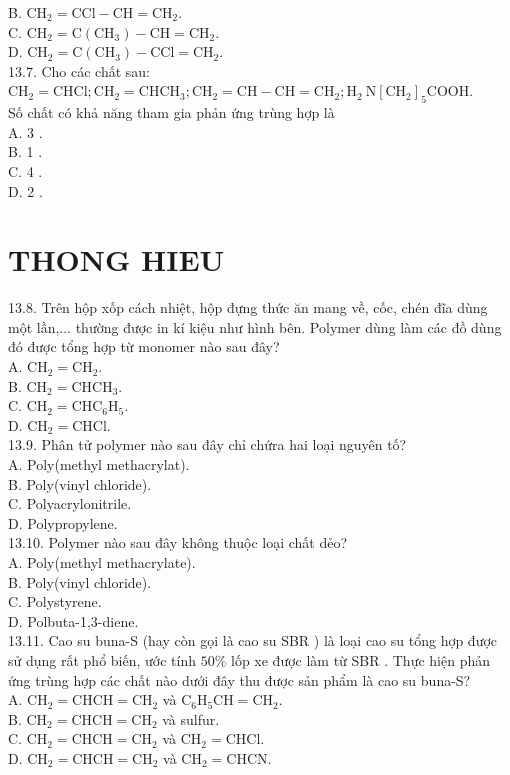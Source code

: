 \documentclass[10pt]{article}
\begin{document}
B. $\mathrm{CH}_{2}=\mathrm{CCl}-\mathrm{CH}=\mathrm{CH}_{2}$.\\
C. $\mathrm{CH}_{2}=\mathrm{C}\left(\mathrm{CH}_{3}\right)-\mathrm{CH}=\mathrm{CH}_{2}$.\\
D. $\mathrm{CH}_{2}=\mathrm{C}\left(\mathrm{CH}_{3}\right)-\mathrm{CCl}=\mathrm{CH}_{2}$.\\
13.7. Cho các chất sau:\\
$\mathrm{CH}_{2}=\mathrm{CHCl} ; \mathrm{CH}_{2}=\mathrm{CHCH}_{3} ; \mathrm{CH}_{2}=\mathrm{CH}-\mathrm{CH}=\mathrm{CH}_{2} ; \mathrm{H}_{2} \mathrm{~N}\left[\mathrm{CH}_{2}\right]_{5} \mathrm{COOH}$.\\
Số chất có khả năng tham gia phản ứng trùng hợp là\\
A. 3 .\\
B. 1 .\\
C. 4 .\\
D. 2 .

\section*{THONG HIEU}
13.8. Trên hộp xốp cách nhiệt, hộp đựng thức ăn mang về, cốc, chén đĩa dùng một lần,... thường được in kí kiệu như hình bên. Polymer dùng làm các đồ dùng đó được tổng hợp từ monomer nào sau đây?\\
A. $\mathrm{CH}_{2}=\mathrm{CH}_{2}$.\\
B. $\mathrm{CH}_{2}=\mathrm{CHCH}_{3}$.\\
C. $\mathrm{CH}_{2}=\mathrm{CHC}_{6} \mathrm{H}_{5}$.\\
D. $\mathrm{CH}_{2}=\mathrm{CHCl}$.\\
13.9. Phân tử polymer nào sau đây chỉ chứra hai loại nguyên tố?\\
A. Poly(methyl methacrylat).\\
B. Poly(vinyl chloride).\\
C. Polyacrylonitrile.\\
D. Polypropylene.\\
13.10. Polymer nào sau đây không thuộc loại chất dẻo?\\
A. Poly(methyl methacrylate).\\
B. Poly(vinyl chloride).\\
C. Polystyrene.\\
D. Polbuta-1,3-diene.\\
13.11. Cao su buna-S (hay còn gọi là cao su SBR ) là loại cao su tổng hợp được sử dụng rất phổ biến, ước tính $50 \%$ lốp xe được làm từ SBR . Thực hiện phản ứng trùng hợp các chất nào dưới đây thu được sản phẩm là cao su buna-S?\\
A. $\mathrm{CH}_{2}=\mathrm{CHCH}=\mathrm{CH}_{2}$ và $\mathrm{C}_{6} \mathrm{H}_{5} \mathrm{CH}=\mathrm{CH}_{2}$.\\
B. $\mathrm{CH}_{2}=\mathrm{CHCH}=\mathrm{CH}_{2}$ và sulfur.\\
C. $\mathrm{CH}_{2}=\mathrm{CHCH}=\mathrm{CH}_{2}$ và $\mathrm{CH}_{2}=\mathrm{CHCl}$.\\
D. $\mathrm{CH}_{2}=\mathrm{CHCH}=\mathrm{CH}_{2}$ và $\mathrm{CH}_{2}=\mathrm{CHCN}$.
\end{document}
